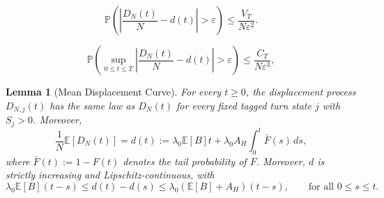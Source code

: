 \documentclass[10pt,a4paper]{amsart}
\newtheorem{lemma}{Lemma}
\newcommand{\E}{\mathbb E}
\newcommand{\pro}{\mathbb P}
\begin{document}
    \begin{equation}
    \label{equ: displacement pointwise concentration}
        \pro\left(\left|\frac{D_N(t)}{N}-d(t)\right|>\varepsilon\right)\leq\frac{V_T}{N\varepsilon^2}.
    \end{equation}

    \begin{equation}
    \label{equ: displacement sample path concentration}
        \pro\left(\sup_{0\leq t\leq T}\left|\frac{D_N(t)}{N}-d(t)\right|>\varepsilon\right)\leq\frac{C_T}{N\varepsilon^3},
    \end{equation}

\begin{lemma}[Mean Displacement Curve]
\label{lem: Mean Displacement Curve}
    For every $t\geq0$, the displacement process $D_{N,j}(t)$ has the same law as $D_N(t)$ for every fixed tagged turn state $j$ with $S_j>0$. Moreover,
    \begin{equation}
    \label{equ: Mean Displacement Curve}
        \frac{1}{N}\E[D_N(t)]=d(t):= \lambda_0\E[B]t + \lambda_0A_H\int_0^t\bar F(s)\,ds,
    \end{equation}
    where $\bar F(t):=1-F(t)$ denotes the tail probability of $F$. Moreover, $d$ is strictly increasing and Lipschitz-continuous, with
    \begin{equation*}
        \lambda_0\E[B](t-s) \leq d(t)-d(s) \leq \lambda_0(\E[B]+A_H)(t-s), \qquad\text{for all } 0\leq s\leq t.
    \end{equation*}
\end{lemma}
\end{document}
